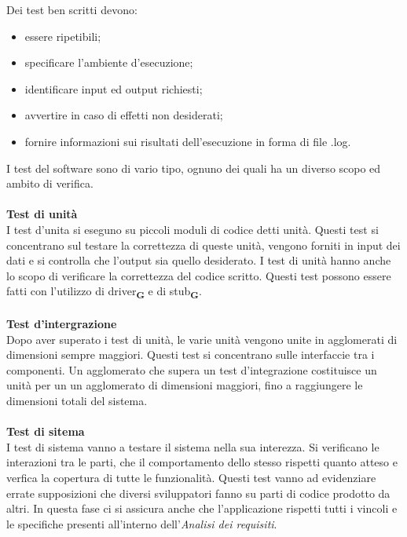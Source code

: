             Dei test ben scritti devono:
            \begin{itemize}
                \item essere ripetibili;
                \item specificare l'ambiente d'esecuzione;
                \item identificare input ed output richiesti;
                \item avvertire in caso di effetti non desiderati;
                \item fornire informazioni sui risultati dell'esecuzione in forma di file {\selectfont .log}.
            \end{itemize}
            I test del software sono di vario tipo, ognuno dei quali ha un diverso scopo ed ambito di verifica.\\
            \\
            \textbf{Test di unità}\\
            I test d'unita si eseguno su piccoli moduli di codice detti unità. Questi test si concentrano sul testare la correttezza di queste unità, vengono forniti in input dei dati e si controlla che l'output sia quello desiderato. I test di unità hanno anche lo scopo di verificare la correttezza del codice scritto. Questi test possono essere fatti con l'utilizzo di driver\textsubscript{\textbf{G}} e di stub\textsubscript{\textbf{G}}.\\
            \\
            \textbf{Test d'intergrazione}\\
            Dopo aver superato i test di unità, le varie unità vengono unite in agglomerati di dimensioni sempre maggiori. Questi test si concentrano sulle interfaccie tra i componenti. Un agglomerato che supera un test d'integrazione costituisce un unità per un un agglomerato di dimensioni maggiori, fino a raggiungere le dimensioni totali del sistema.\\
            \\
            \textbf{Test di sitema}\\
            I test di sistema vanno a testare il sistema nella sua interezza. Si verificano le interazioni tra le parti, che il comportamento dello stesso rispetti quanto atteso e verfica la copertura di tutte le funzionalità. Questi test vanno ad evidenziare errate supposizioni che diversi sviluppatori fanno su parti di codice prodotto da altri.
            In questa fase ci si assicura anche che l'applicazione rispetti tutti i vincoli e le specifiche presenti all'interno dell'\textit{Analisi dei requisiti}.\\
